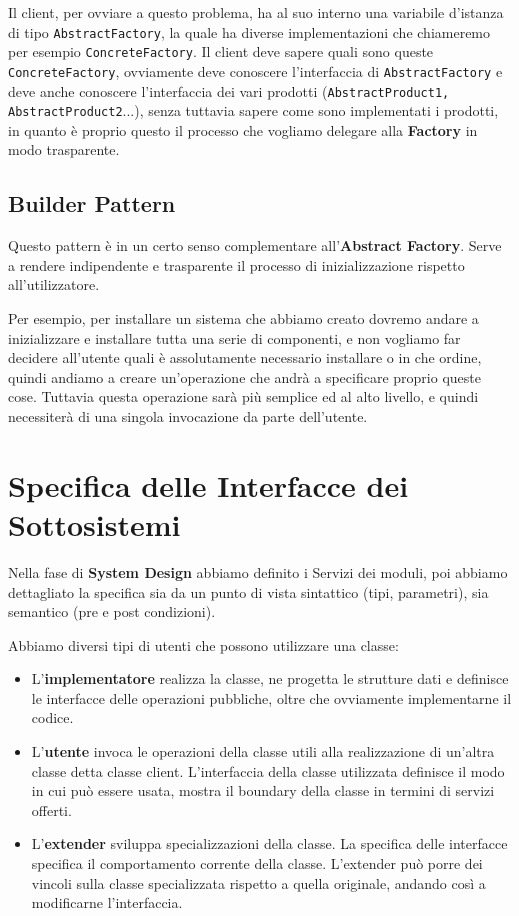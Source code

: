             Il client, per ovviare a questo problema, ha al suo interno una variabile d'istanza di tipo \texttt{AbstractFactory}, la quale ha diverse implementazioni che chiameremo per esempio \texttt{ConcreteFactory}. Il client deve sapere quali sono queste \texttt{ConcreteFactory}, ovviamente deve conoscere l'interfaccia di \texttt{AbstractFactory} e deve anche conoscere l'interfaccia dei vari prodotti (\texttt{AbstractProduct1, AbstractProduct2}...), senza tuttavia sapere come sono implementati i prodotti, in quanto è proprio questo il processo che vogliamo delegare alla \textbf{Factory} in modo trasparente.
            
        \subsection{Builder Pattern}
            Questo pattern è in un certo senso complementare all'\textbf{Abstract Factory}. Serve a rendere indipendente e trasparente il processo di inizializzazione rispetto all'utilizzatore.
            
            Per esempio, per installare un sistema che abbiamo creato dovremo andare a inizializzare e installare tutta una serie di componenti, e non vogliamo far decidere all'utente quali è assolutamente necessario installare o in che ordine, quindi andiamo a creare un'operazione che andrà a specificare proprio queste cose. Tuttavia questa operazione sarà più semplice ed al alto livello, e quindi necessiterà di una singola invocazione da parte dell'utente.
            
    
    \section{Specifica delle Interfacce dei Sottosistemi}
        Nella fase di \textbf{System Design} abbiamo definito i Servizi dei moduli, poi abbiamo dettagliato la specifica sia da un punto di vista sintattico (tipi, parametri), sia semantico (pre e post condizioni).
        
        Abbiamo diversi tipi di utenti che possono utilizzare una classe:
        \begin{itemize}
            \item L'\textbf{implementatore} realizza la classe, ne progetta le strutture dati e definisce le interfacce delle operazioni pubbliche, oltre che ovviamente implementarne il codice.
            \item L'\textbf{utente} invoca le operazioni della classe utili alla realizzazione di un'altra classe detta classe client. L'interfaccia della classe utilizzata definisce il modo in cui può essere usata, mostra il boundary della classe in termini di servizi offerti.
            \item L'\textbf{extender} sviluppa specializzazioni della classe. La specifica delle interfacce specifica il comportamento corrente della classe. L'extender può porre dei vincoli sulla classe specializzata rispetto a quella originale, andando così a modificarne l'interfaccia.
        \end{itemize}
        
